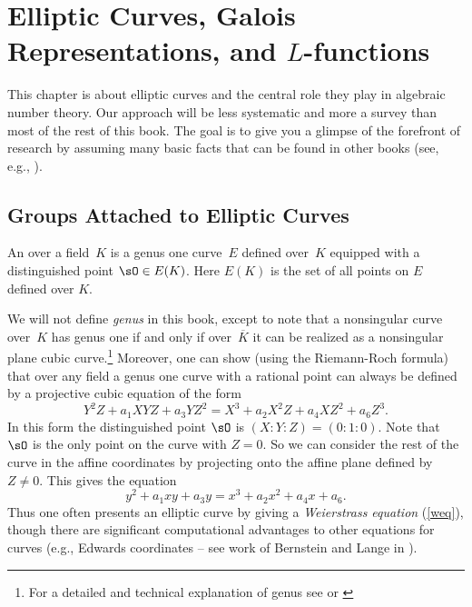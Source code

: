 
\chapter[Elliptic Curves and $L$-functions]{
  Elliptic Curves, Galois Representations, and $L$-functions
}

This chapter is about elliptic curves and the central role they play
in algebraic number theory.  Our approach will be less systematic and
more a survey than most of the rest of this book.  The goal is to
give you a glimpse of the forefront of research by assuming many basic
facts that can be found in other books (see, e.g.,
\cite{silverman:aec}).

\section{Groups Attached to Elliptic Curves}

\begin{definition}\label{defn:ec}
  An  over a field~$K$ is a genus one curve~$E$
  defined over~$K$ equipped with a distinguished point $\sO \in E(K)$.
  Here $E(K)$ is the set of all points on $E$ defined over $K$.
\end{definition}

We will not define \emph{genus} in this book, except to note that a
nonsingular curve over~$K$ has genus one if and only if over~$\overline{K}$
it can be realized as a nonsingular plane cubic curve.\footnote{
  For a detailed and technical explanation of genus
  see \cite[Ch.~II.8]{hartshorne} or
  \cite[Ch.~7.3]{liu2006algebraic}
}
Moreover, one
can show (using the Riemann-Roch formula) that over any field a genus
one curve with a rational point can always be defined by a projective
cubic equation of the form
\[
  Y^2 Z + a_1 XYZ + a_3 YZ^2 = X^3  + a_2 X^2Z + a_4 XZ^2 + a_6 Z^3.
\]
In this form the distinguished point $\sO$ is $(X:Y:Z) = (0:1:0)$.
Note that $\sO$ is the only point on the curve with $Z=0$. So we
can consider the rest of the curve in the affine coordinates
by projecting onto the affine plane defined by $Z\neq 0$.
This gives the equation
\begin{equation}\label{weq}
  y^2 +a_1 xy + a_3 y = x^3 + a_2 x^2 + a_4 x + a_6.
\end{equation}
Thus one often presents an elliptic curve by giving a
\emph{Weierstrass equation} (\ref{weq}), though there are significant
computational advantages to other equations for curves
(e.g., Edwards coordinates -- see work of Bernstein and Lange in
\cite{bernstein2007inverted}).

